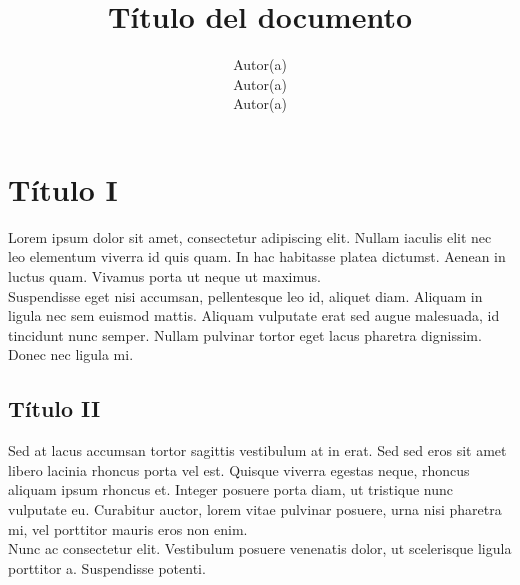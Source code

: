 \documentclass[stu, 12pt, letterpaper, donotrepeattitle, floatsintext, natbib]{apa7}
\title{\Large Título del documento}
\author{Autor(a) \\Autor(a) \\Autor(a)}
\affiliation{Nombre de la institución}
\newcommand{\myparagraph}[1]{\paragraph{#1}\mbox{}\\}
\begin{document}
\maketitle
{}

\renewcommand\contentsname{\largeÍndice}
\tableofcontents
\setcounter{tocdepth}{2}
\newpage
\renewcommand{\listfigurename}{\largeÍndice de fíguras}
\listoffigures
\newpage
\renewcommand{\listtablename}{\largeÍndice de tablas}
\listoftables
\newpage


\section{\large Título I}
Lorem ipsum dolor sit amet, consectetur adipiscing elit. Nullam iaculis elit nec leo elementum viverra id quis quam. In hac habitasse platea dictumst. Aenean in luctus quam. Vivamus porta ut neque ut maximus.\\ Suspendisse eget nisi accumsan, pellentesque leo id, aliquet diam. Aliquam in ligula nec sem euismod mattis. Aliquam vulputate erat sed augue malesuada, id tincidunt nunc semper. Nullam pulvinar tortor eget lacus pharetra dignissim. Donec nec ligula mi.\par

\subsection{Título II} 
Sed at lacus accumsan tortor sagittis vestibulum at in erat. Sed sed eros sit amet libero lacinia rhoncus porta vel est. Quisque viverra egestas neque, rhoncus aliquam ipsum rhoncus et. Integer posuere porta diam, ut tristique nunc vulputate eu. Curabitur auctor, lorem vitae pulvinar posuere, urna nisi pharetra mi, vel porttitor mauris eros non enim.\\ Nunc ac consectetur elit. Vestibulum posuere venenatis dolor, ut scelerisque ligula porttitor a. Suspendisse potenti.\par
\newpage
\end{document}
